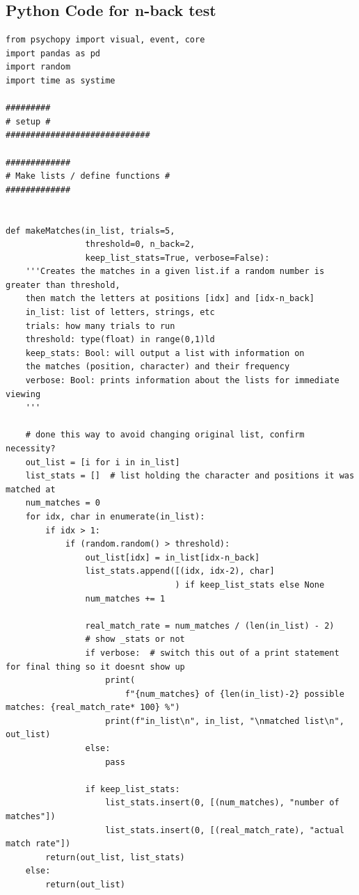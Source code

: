 \documentclass{article}
\begin{document}
\subsection{Python Code for n-back test}
\label{sec:org710c01e}
\begin{verbatim}
from psychopy import visual, event, core
import pandas as pd
import random
import time as systime

#########
# setup #
#############################

#############
# Make lists / define functions #
#############


def makeMatches(in_list, trials=5,
                threshold=0, n_back=2,
                keep_list_stats=True, verbose=False):
    '''Creates the matches in a given list.if a random number is greater than threshold,
    then match the letters at positions [idx] and [idx-n_back]
    in_list: list of letters, strings, etc
    trials: how many trials to run
    threshold: type(float) in range(0,1)ld
    keep_stats: Bool: will output a list with information on
    the matches (position, character) and their frequency
    verbose: Bool: prints information about the lists for immediate viewing
    '''

    # done this way to avoid changing original list, confirm necessity?
    out_list = [i for i in in_list]
    list_stats = []  # list holding the character and positions it was matched at
    num_matches = 0
    for idx, char in enumerate(in_list):
        if idx > 1:
            if (random.random() > threshold):
                out_list[idx] = in_list[idx-n_back]
                list_stats.append([(idx, idx-2), char]
                                  ) if keep_list_stats else None
                num_matches += 1

                real_match_rate = num_matches / (len(in_list) - 2)
                # show _stats or not
                if verbose:  # switch this out of a print statement for final thing so it doesnt show up
                    print(
                        f"{num_matches} of {len(in_list)-2} possible matches: {real_match_rate* 100} %")
                    print(f"in_list\n", in_list, "\nmatched list\n", out_list)
                else:
                    pass

                if keep_list_stats:
                    list_stats.insert(0, [(num_matches), "number of matches"])
                    list_stats.insert(0, [(real_match_rate), "actual match rate"])
        return(out_list, list_stats)
    else:
        return(out_list)



\end{verbatim}
\end{document}
